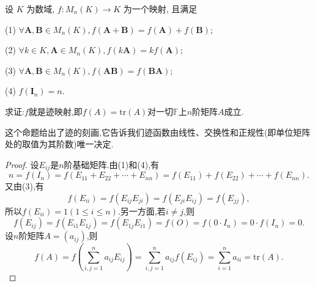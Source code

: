 \documentclass[../../main.tex]{subfiles}%
\begin{document}
\begin{theorem}[矩阵迹的刻画]\label{theorem:矩阵迹的刻画}
设 \( K \) 为数域, \( f: M_n(K) \to K \) 为一个映射, 且满足

(1) \( \forall \boldsymbol{A}, \boldsymbol{B} \in M_n(K), f(\boldsymbol{A} + \boldsymbol{B}) = f(\boldsymbol{A}) + f(\boldsymbol{B}) \);

(2) \( \forall k \in K, \boldsymbol{A} \in M_n(K), f(k\boldsymbol{A}) = kf(\boldsymbol{A}) \);

(3) \( \forall \boldsymbol{A}, \boldsymbol{B} \in M_n(K), f(\boldsymbol{AB}) = f(\boldsymbol{BA}) \);

(4) \( f(\boldsymbol{I}_n) = n \).

求证:\(f\)就是迹映射,即\(f(A)=\mathrm{tr}(A)\)对一切\(\mathbb{F}\)上\(n\)阶矩阵\(A\)成立.
\end{theorem}
\begin{note}
这个命题给出了迹的刻画,它告诉我们迹函数由线性、交换性和正规性(即单位矩阵处的取值为其阶数)唯一决定.
\end{note}
\begin{proof}

设\(E_{ij}\)是\(n\)阶基础矩阵.由(1)和(4),有
\[
n = f(I_n)=f(E_{11}+E_{22}+\cdots+E_{nn})=f(E_{11})+f(E_{22})+\cdots+f(E_{nn}).
\]
又由(3),有
\[
f(E_{ii})=f(E_{ij}E_{ji})=f(E_{ji}E_{ij})=f(E_{jj}),
\]
所以\(f(E_{ii}) = 1(1\leqslant  i\leqslant  n)\).另一方面,若\(i\neq j\),则
\[
f(E_{ij})=f(E_{i1}E_{1j})=f(E_{1j}E_{i1})=f(O)=f(0\cdot I_n)=0\cdot f(I_n)=0.
\]
设\(n\)阶矩阵\(A=(a_{ij})\),则
\[
f(A)=f\left(\sum_{i,j = 1}^{n}a_{ij}E_{ij}\right)=\sum_{i,j = 1}^{n}a_{ij}f(E_{ij})=\sum_{i = 1}^{n}a_{ii}=\mathrm{tr}(A).
\]

\end{proof}
\end{document}
